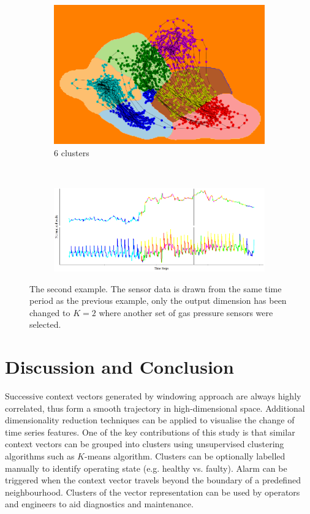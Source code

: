 \documentclass[runningheads]{llncs}
\begin{document}
\begin{figure}[H]
	\begin{subfigure}[b]{0.35\textwidth}
		\includegraphics[width=\textwidth]{ex2_pca_cluster_6.PNG}
		\caption{\(6\) clusters}
		\label{fig:ex2_pca_cluster_6}
	\end{subfigure}
	~
	\begin{subfigure}[b]{0.6\textwidth}
		\includegraphics[width=\textwidth]{ex2_context_timeline_6.PNG}
		\label{fig:ex2_context_timeline_6}
	\end{subfigure}
	
	\caption{The second example. The sensor data is drawn from the same time period as the previous example, only the output dimension has been changed to \(K=2\) where another set of gas pressure sensors were selected. }
	\label{fig:ex2_pca_cluster}
\end{figure}


\section{Discussion and Conclusion}

Successive context vectors generated by windowing approach are always highly correlated, thus form a smooth trajectory in high-dimensional space. Additional dimensionality reduction techniques can be applied to visualise the change of time series features. One of the key contributions of this study is that similar context vectors can be grouped into clusters using unsupervised clustering algorithms such as \(K\)-means algorithm. Clusters can be optionally labelled manually to identify operating state (e.g. healthy vs. faulty). Alarm can be triggered when the context vector travels beyond the boundary of a predefined neighbourhood. Clusters of the vector representation can be used by operators and engineers to aid diagnostics and maintenance.
\end{document}
